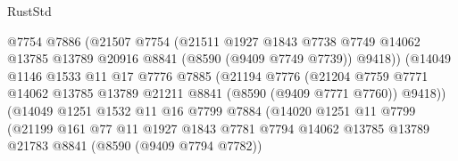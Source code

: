 \begin{lexlean}{RustStd}
\begin{coremodule}
                                @7754
                                @7886
                                (@21507
                                  @7754
                                  (@21511
                                    @1927
                                    @1843
                                    @7738
                                    @7749
                                    @14062
                                    @13785
                                    @13789
                                    @20916
                                    @8841
                                    (@8590 (@9409 @7749 @7739))
                                    @9418))
                                (@14049
                                  @1146
                                  @1533
                                  @11
                                  @17
                                  @7776
                                  @7885
                                  (@21194
                                    @7776
                                    (@21204
                                      @7759
                                      @7771
                                      @14062
                                      @13785
                                      @13789
                                      @21211
                                      @8841
                                      (@8590 (@9409 @7771 @7760))
                                      @9418))
                                  (@14049
                                    @1251
                                    @1532
                                    @11
                                    @16
                                    @7799
                                    @7884
                                    (@14020
                                      @1251
                                      @11
                                      @7799
                                      (@21199
                                        @161
                                        @77
                                        @11
                                        @1927
                                        @1843
                                        @7781
                                        @7794
                                        @14062
                                        @13785
                                        @13789
                                        @21783
                                        @8841
                                        (@8590 (@9409 @7794 @7782))

\end{coremodule}
\end{lexlean}
